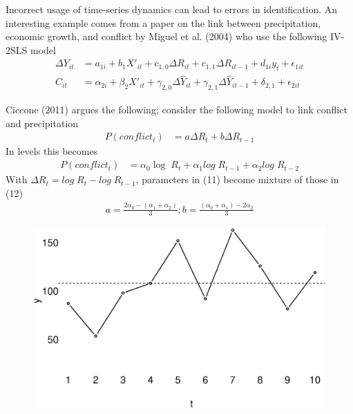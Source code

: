 \documentclass{beamer}
\begin{document}
\begin{frame}
  Incorrect usage of time-series dynamics can lead to errors in identification. 
  An interesting example comes from a paper on the link between precipitation, economic growth, and conflict by Miguel et al. (2004) who use the following IV-2SLS model
  \begin{align}
    \Delta Y_{it} &= a_{1i} + b_1X'_{it} + c_{1,0}\Delta R_{it} + c_{1,1} \Delta R_{it-1} + d_{1i}y_t +\epsilon_{1it}\\
    C_{it} &= \alpha_{2i} + \beta_2 X'_{it} + \gamma_{2,0} \Delta \hat{Y}_{it} + \gamma_{2,1} \Delta \hat{Y}_{it-1} + \delta_{2,1} + \epsilon_{2it}
  \end{align}  
\end{frame}


\begin{frame}
  Ciccone (2011) argues the following; consider the following model to link conflict and precipitation   
  \begin{align}
    P(conflict_t) &= a \Delta R_t + b \Delta R_{t-1}  
  \end{align}
  \medskip
  In levels this becomes
  \begin{align}
    P(conflict_t) &= \alpha_0\log\; R_t + \alpha_1 log\; R_{t-1} + \alpha_2 log\; R_{t-2}  
  \end{align}
  \medskip
  With   $\Delta R_t = log\;R_t - log\; R_{t-1}$, parameters in (11) become mixture of those in (12)
  \begin{align}
    a=\frac{2\alpha_0-(\alpha_1+\alpha_2)}{3}; b=\frac{(\alpha_0 + \alpha_1)-2\alpha_2}{3}      
    \end{align}  
\end{frame}

\begin{frame}
  \begin{figure}
    \includegraphics[scale=.4]{mean_reversion.eps}
  \end{figure}
\end{frame}
\end{document}
